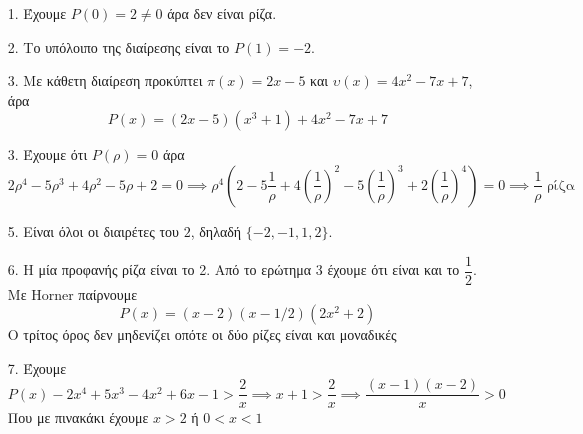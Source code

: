\documentclass[12pt]{article}
\begin{document}
\begin{enumerate}
 \item[1.] Έχουμε $P(0)=2 \ne 0$ άρα δεν είναι ρίζα.
 \item[2.] Το υπόλοιπο της διαίρεσης είναι το $P(1)=-2$.
 \item[3.] Με κάθετη διαίρεση προκύπτει $π(x)=2x-5$ και $υ(x)=4x^2-7x+7$, άρα $$P(x)=(2x-5)(x^3+1)+4x^2-7x+7$$
 \item[3.] Έχουμε ότι $P(ρ)=0$ άρα
 $$2ρ^4-5ρ^3+4ρ^2-5ρ+2=0 \implies ρ^4(2-5\dfrac{1}{ρ}+4(\dfrac{1}{ρ})^2-5(\dfrac{1}{ρ})^3+2(\dfrac{1}{ρ})^4)=0\implies \dfrac{1}{ρ} \text{ ρίζα}$$
 \item[5.] Είναι όλοι οι διαιρέτες του $2$, δηλαδή $\{-2,-1,1,2\}$.
 \item[6.] Η μία προφανής ρίζα είναι το 2. Από το ερώτημα 3 έχουμε ότι είναι και το $\dfrac{1}{2}$. Με Horner παίρνουμε
 $$P(x)=(x-2)(x-1/2)(2x^2+2)$$
 Ο τρίτος όρος δεν μηδενίζει οπότε οι δύο ρίζες είναι και μοναδικές
 \item[7.] Έχουμε
 $$P(x)-2x^4+5x^3-4x^2+6x-1>\dfrac{2}{x} \implies x+1>\dfrac{2}{x} \implies \dfrac{(x-1)(x-2)}{x}>0$$
 Που με πινακάκι έχουμε $x>2$ ή $0<x<1$
\end{enumerate}
\end{document}
